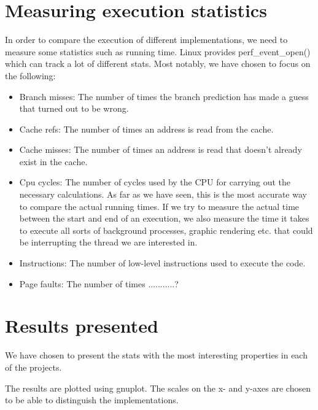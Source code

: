 \section{Measuring execution statistics} \label{section:perf_stat}
In order to compare the execution of different implementations, we need to
measure some statistics such as running time. 
Linux provides perf\_event\_open() \citep{perfStat} which can track a lot of
different stats. Most notably, we have chosen to focus on the following:
\begin{itemize}
 \item Branch misses: The number of times the branch prediction has made a guess
that turned out to be wrong.
 \item Cache refs: The number of times an address is read from the cache.
 \item Cache misses: The number of times an address is read that doesn't already
exist in the cache.
 \item Cpu cycles: The number of cycles used by the CPU for carrying out the
necessary calculations. As far as we have seen, this is the most accurate way to
compare the actual running times. If we try to measure the actual time between
the start and end of an execution, we also measure the time it takes to execute
all sorts of background processes, graphic rendering etc. that could be
interrupting the thread we are interested in.
 
 \item Instructions: The number of low-level instructions used to execute the
code.
 \item Page faults: The number of times ...........?
\end{itemize}




\section{Results presented}
We have chosen to present the stats with the most interesting properties in each
of the projects.

The results are plotted using gnuplot.
The scales on the x- and y-axes are chosen to be able to distinguish the
implementations.


All implementations, executables, figures etc. is available at \citep{github}.